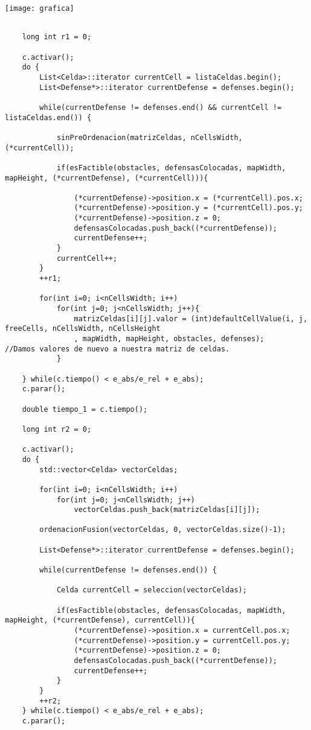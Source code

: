 \texttt{[image: grafica]}


\begin{lstlisting}
 
    long int r1 = 0;
	
    c.activar();
    do {	
		List<Celda>::iterator currentCell = listaCeldas.begin();
		List<Defense*>::iterator currentDefense = defenses.begin();

		while(currentDefense != defenses.end() && currentCell != listaCeldas.end()) {
			
			sinPreOrdenacion(matrizCeldas, nCellsWidth, (*currentCell));
			
			if(esFactible(obstacles, defensasColocadas, mapWidth, mapHeight, (*currentDefense), (*currentCell))){
				
				(*currentDefense)->position.x = (*currentCell).pos.x;
				(*currentDefense)->position.y = (*currentCell).pos.y;
				(*currentDefense)->position.z = 0; 
			    defensasColocadas.push_back((*currentDefense));
				currentDefense++;
			}
			currentCell++;
		}
		++r1;
	
		for(int i=0; i<nCellsWidth; i++)
			for(int j=0; j<nCellsWidth; j++){
				matrizCeldas[i][j].valor = (int)defaultCellValue(i, j, freeCells, nCellsWidth, nCellsHeight
				, mapWidth, mapHeight, obstacles, defenses);	//Damos valores de nuevo a nuestra matriz de celdas.
			}

    } while(c.tiempo() < e_abs/e_rel + e_abs);
    c.parar();
    
    double tiempo_1 = c.tiempo();
    
    long int r2 = 0;
    
    c.activar();
    do {	
	    std::vector<Celda> vectorCeldas;
	    
    	for(int i=0; i<nCellsWidth; i++)
    		for(int j=0; j<nCellsWidth; j++)
    			vectorCeldas.push_back(matrizCeldas[i][j]); 
		
		ordenacionFusion(vectorCeldas, 0, vectorCeldas.size()-1);
			
		List<Defense*>::iterator currentDefense = defenses.begin();
		
		while(currentDefense != defenses.end()) {
			
			Celda currentCell = seleccion(vectorCeldas);

			if(esFactible(obstacles, defensasColocadas, mapWidth, mapHeight, (*currentDefense), currentCell)){
				(*currentDefense)->position.x = currentCell.pos.x;
				(*currentDefense)->position.y = currentCell.pos.y;
				(*currentDefense)->position.z = 0; 
			    defensasColocadas.push_back((*currentDefense));
				currentDefense++;
			}
		}
		++r2;
    } while(c.tiempo() < e_abs/e_rel + e_abs);
    c.parar();
    

\end{lstlisting}
